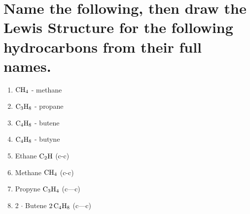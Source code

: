 \documentclass{scrartcl}
\begin{document}
\section{Name the following, then draw the Lewis Structure for the following hydrocarbons from their full names.}
\label{sec:orge218002}

\begin{enumerate}
\item \(\ce{CH4}\) - methane
\item \(\ce{C3H8}\) - propane
\item \(\ce{C4H8}\) - butene
\item \(\ce{C4H8}\) - butyne

\item Ethane \(\ce{C2H}\) (c-c)
\item Methane \(\ce{CH4}\) (c-c)
\item Propyne \(\ce{C3H4}\) (c---c)
\item 2 \(\cdot\) Butene \(\ce{2C4H8}\) (c---c)
\end{enumerate}
\end{document}
